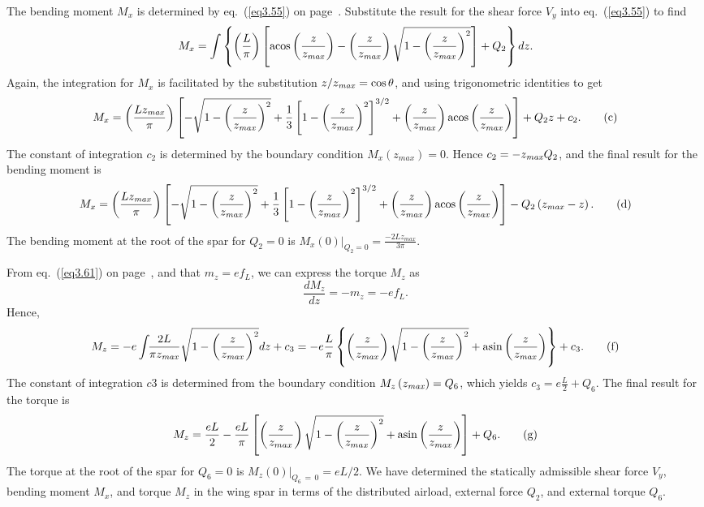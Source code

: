 \documentclass{AeroStructure-ERJohnson}
\begin{document}
\begin{example*}
The bending moment $M_x$ is determined by eq.~(\ref{eq3.55}) on page~\pageref{eq3.55}. Substitute the result for the shear force $V_y$ into eq.~(\ref{eq3.55}) to find
\[
M_{x}=\int\left\{\left(\frac{L}{\pi}\right)\left[\operatorname{acos}\left(\frac{z}{z_{\it max }}\right)-\left(\frac{z}{z_{\it max }}\right) \sqrt{1-\left(\frac{z}{z_{\it max }}\right)^{2}}\right]+Q_{2}\right\} d z.
\]
Again, the integration for $M_x$ is facilitated by the substitution $z/z_{\it max}=\cos \theta$, and using trigonometric identities to get
\begin{equation*}
M_{x}=\left(\frac{L z_{\it max}}{\pi}\right)\left[-\sqrt{1-\left(\frac{z}{z_{\it max }}\right)^{2}}+\frac{1}{3}\left[1-\left(\frac{z}{z_{\it max }}\right)^{2}\right]^{3 / 2}+\left(\frac{z}{z_{\it max }}\right) \operatorname{acos}\left(\frac{z}{z_{\it max }}\right)\right]+Q_{2} z+c_{2}.\tag{c}
\end{equation*}
The constant of integration $c_2$ is determined by the boundary condition $M_{x}\left(z_{max}\right)=0$. Hence $c_{2}=-z_{\it max } Q_{2}$, and the final result for the bending moment is
\begin{equation*}
M_{x}=\left(\frac{L z_{\it max }}{\pi}\right)\left[-\sqrt{1-\left(\frac{z}{z_{\it max }}\right)^{2}}+\frac{1}{3}\left[1-\left(\frac{z}{z_{\it max }}\right)^{2}\right]^{3 / 2}+\left(\frac{z}{z_{\it max }}\right) \operatorname{acos}\left(\frac{z}{z_{\it max }}\right)\right]-Q_{2}\left(z_{\it max }-z\right).\tag{d}
\end{equation*}
The bending moment at the root of the spar for $Q_2 = 0$ is $\left.M_{x}(0)\right|_{Q_{2}=0}=\frac{-2 L z_{m a x}}{3 \pi}$.

From eq.~(\ref{eq3.61}) on page~\pageref{eq3.61}, and that ${m}_{z}=e f_{L}$, we can express the torque $M_z$ as
\begin{equation*}
\frac{d M_{z}}{d z}=-m_{z}=-e f_{L}.\tag{e}
\end{equation*}
Hence,
\begin{equation*}
M_{z}=-e \int \!\!\frac{2 L}{\pi z_{\it max }} \sqrt{1-\left(\frac{z}{z_{\it max }}\right)^{2}} d z+c_{3}=-e \frac{L}{\pi}\left\{\left(\frac{z}{z_{\it max }}\right) \sqrt{1-\left(\frac{z}{z_{\it max }}\right)^{2}}+\operatorname{asin}\left(\frac{z}{z_{\it max }}\right)\right\}+c_{3}.\tag{f}
\end{equation*}
The constant of integration $c$3 is determined from the boundary condition $M_{z}\left(z_{\it max }\right)=Q_{6}$, which yields $c_{3}=e \frac{L}{2}+Q_{6}$. The final result for the torque is
\begin{equation*}
M_{z}=\frac{e L}{2}-\frac{e L}{\pi}\left[\left(\frac{z}{z_{m a x}}\right) \sqrt{1-\left(\frac{z}{z_{m a x}}\right)^{2}}+\operatorname{asin}\left(\frac{z}{z_{\it max }}\right)\right]+Q_{6}.\tag{g}
\end{equation*}
The torque at the root of the spar for $Q_6 = 0$ is $\left.M_{z}(0)\right|_{Q_{6}\,=\,0}=e L / 2$. We have determined the statically admissible shear force $V_y$, bending moment $M_x$, and torque $M_z$ in the wing spar in terms of the distributed airload, external force $Q_2$, and external torque $Q_6$.


\end{example*}
\end{document}
